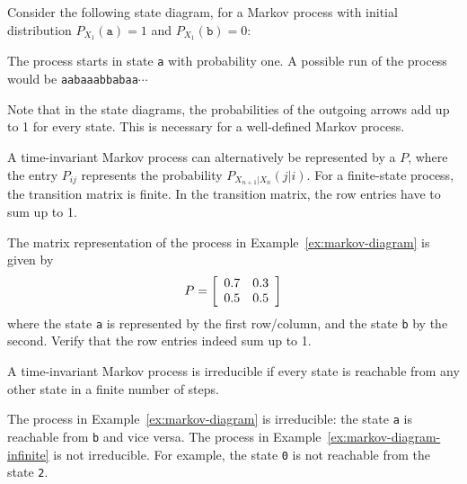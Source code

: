 \begin{example} \label{ex:markov-diagram}
Consider the following state diagram, for a Markov process with initial distribution $P_{X_1}(\texttt{a}) = 1$ and $P_{X_1}(\texttt{b}) = 0$:
\begin{center}
\end{center}
The process starts in state \texttt{a} with probability one. A possible run of the process would be \texttt{aabaaabbabaa}$\cdots$
\end{example}

Note that in the state diagrams, the probabilities of the outgoing arrows add up to 1 for every state. This is necessary for a well-defined Markov process.

A time-invariant Markov process can alternatively be represented by a  $P$, where the entry $P_{ij}$ represents the probability $P_{X_{n+1}|X_{n}}(j|i)$. For a finite-state process, the transition matrix is finite. In the transition matrix, the row entries have to sum up to 1.

\begin{example}
The matrix representation of the process in Example~\ref{ex:markov-diagram} is given by
\[
P = \left[
\begin{array}{c c}
0.7&0.3\\
0.5&0.5
\end{array}
\right]
\]
where the state \texttt{a} is represented by the first row/column, and the state \texttt{b} by the second. Verify that the row entries indeed sum up to 1.
\end{example}

\begin{definition}
A time-invariant Markov process is irreducible if every state is reachable from any other state in a finite number of steps.
\end{definition}

The process in Example~\ref{ex:markov-diagram} is irreducible: the state \texttt{a} is reachable from \texttt{b} and vice versa.  The process in Example~\ref{ex:markov-diagram-infinite} is not irreducible. For example, the state \texttt{0} is not reachable from the state \texttt{2}.

